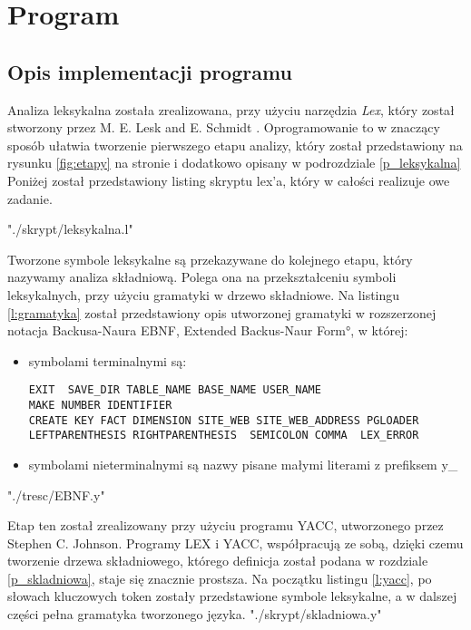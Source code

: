 \chapter{Program}

\section{Opis implementacji programu}



Analiza leksykalna została zrealizowana, 
  przy użyciu narzędzia \textit{Lex},
  który został stworzony przez M. E. Lesk and E. Schmidt \cite{link_lex}.
Oprogramowanie to w znaczący sposób ułatwia tworzenie pierwszego etapu analizy,
 który został przedstawiony na rysunku \ref{fig:etapy} na stronie \pageref{fig:etapy} 
 i dodatkowo opisany  w podrozdziale \ref{p_leksykalna}
Poniżej został przedstawiony listing skryptu lex'a,
 który w całości realizuje owe zadanie.

 {"./skrypt/leksykalna.l"}


Tworzone symbole leksykalne są przekazywane do kolejnego etapu,
 który nazywamy analiza składniową. 
Polega ona na przekształceniu symboli leksykalnych, przy użyciu gramatyki w drzewo składniowe.
Na listingu \ref{l:gramatyka} został przedstawiony opis utworzonej gramatyki  
 w rozszerzonej notacja Backusa-Naura   \ang{ EBNF, Extended Backus-Naur Form},
 w której:
\begin{itemize}
 \item symbolami terminalnymi są:
\begin{verbatim}
EXIT  SAVE_DIR TABLE_NAME BASE_NAME USER_NAME
MAKE NUMBER IDENTIFIER 
CREATE KEY FACT DIMENSION SITE_WEB SITE_WEB_ADDRESS PGLOADER
LEFTPARENTHESIS RIGHTPARENTHESIS  SEMICOLON COMMA  LEX_ERROR 
\end{verbatim}
 \item symbolami nieterminalnymi są nazwy pisane małymi literami z prefiksem y\_
\end{itemize}

 {"./tresc/EBNF.y"}


Etap ten został zrealizowany przy użyciu programu YACC,
 utworzonego przez Stephen C. Johnson.
Programy LEX i YACC, współpracują ze sobą, dzięki czemu tworzenie drzewa składniowego,
 którego definicja został podana w rozdziale \ref{p_skladniowa}, 
 staje się znacznie prostsza.
Na początku listingu  \ref{l:yacc},
 po słowach kluczowych token zostały przedstawione symbole leksykalne,
a w dalszej części pełna gramatyka tworzonego języka.
 {"./skrypt/skladniowa.y"}  


